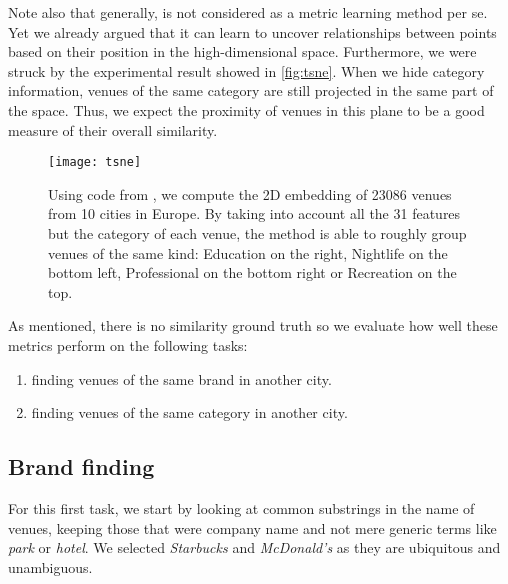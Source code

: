 Note also that generally, \tsne{} is not considered as a metric learning method
per se. Yet we already argued that it can learn to uncover relationships between
points based on their position in the high-dimensional space. Furthermore, we
were struck by the experimental result showed in \autoref{fig:tsne}. When we hide
category information, venues of the same category are still projected in the
same part of the space. Thus, we expect the proximity of venues in this
plane to be a good measure of their overall similarity.

\begin{figure}[htpb]
	\centering
	\texttt{[image: tsne]}
	\caption[2D projection of European venues by t-SNE]{Using code from
		\cite{BarnesHut13}, we compute the 2D embedding of 23086 venues from 10 cities in
		Europe. By taking into account all the 31 features but the category of each
		venue, the method is able to roughly group venues of the same kind: Education
		on the right, Nightlife on the bottom left, Professional on the bottom right
	or Recreation on the top. \label{fig:tsne}}
\end{figure}

As mentioned, there is no similarity ground truth so we evaluate how well these
metrics perform on the following tasks:
\begin{enumerate}
	\item finding venues of the same brand in another city.
	\item finding venues of the same category in another city.
\end{enumerate}		

\subsection{Brand finding}
\label{sub:brand_finding}

For this first task, we start by looking at common substrings in the name of
venues, keeping those that were company name and not mere generic terms like
\emph{park} or \emph{hotel}. We selected \emph{Starbucks} and \emph{McDonald's}
as they are ubiquitous and unambiguous.


